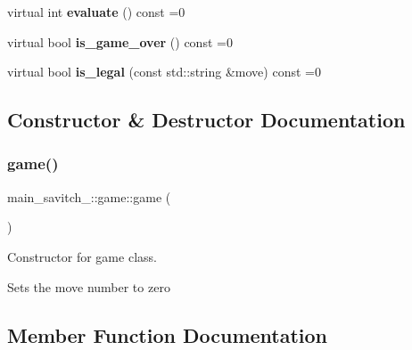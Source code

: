 \begin{DoxyCompactItemize}
\item 
\mbox{\label{classmain__savitch__14_1_1game_a9b9c8c5e9aa57c9a430f20b87cb047aa}} 
virtual int {\bfseries evaluate} () const =0
\item 
\mbox{\label{classmain__savitch__14_1_1game_a49eed20648918b03fd3e2cf78987b3d1}} 
virtual bool {\bfseries is\+\_\+game\+\_\+over} () const =0
\item 
\mbox{\label{classmain__savitch__14_1_1game_ad38351422ca1ee3ae58440c1c6b36b30}} 
virtual bool {\bfseries is\+\_\+legal} (const std\+::string \&move) const =0
\end{DoxyCompactItemize}


\subsection{Constructor \& Destructor Documentation}
\mbox{\label{classmain__savitch__14_1_1game_a65afffa6f5aa8dcd781ad38f898130e0}} 
\subsubsection{\texorpdfstring{game()}{game()}}
{\footnotesize\ttfamily main\+\_\+savitch\+\_\+::game\+::game (\begin{DoxyParamCaption}{ }\end{DoxyParamCaption})\hspace{0.3cm}{\ttfamily [inline]}}



Constructor for game class. 

Sets the move number to zero 

\subsection{Member Function Documentation}
\mbox{\label{classmain__savitch__14_1_1game_a51e5d7be01076996b68449983874ff8f}} 

